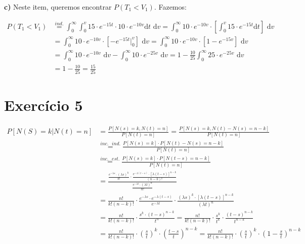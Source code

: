 \documentclass[12pt]{article}
\begin{document}
	\textbf{c)} Neste item, queremos encontrar $P(T_1 < V_1)$. Fazemos:
	
	\begin{equation*}
		\begin{split}
			P(T_1 < V_1) & \stackrel{ind.}{=} \int_{0}^{\infty} \int_{0}^{v} 15\cdot e^{-15t} \cdot 10\cdot e^{-10v} \text{d}t \text{ d}v = \int_{0}^{\infty} 10\cdot e^{-10v} \cdot \left[\int_{0}^{v} 15\cdot e^{-15t} \text{d}t\right] \text{ d}v \\
			& = \int_{0}^{\infty} 10\cdot e^{-10v} \cdot \left[-e^{-15t} \rvert_{0}^{v}\right] \text{ d}v = \int_{0}^{\infty} 10\cdot e^{-10v} \cdot \left[1 - e^{-15v} \right] \text{ d}v \\
			& = \int_{0}^{\infty} 10\cdot e^{-10v} \text{ d}v - \int_{0}^{\infty} 10\cdot e^{-25v} \text{ d}v = 1 - \frac{10}{25} \int_{0}^{\infty} 25\cdot e^{-25v} \text{ d}v \\
			& = 1 - \frac{10}{25} = \frac{15}{25}
		\end{split}
	\end{equation*}    
	 
	 \section*{Exercício 5}
	 
	 \begin{equation*}
	 	\begin{split}
		 	P[N(S) = k | N(t) = n] & = \frac{P[N(s) = k, N(t) = n]}{P[N(t) = n]} = \frac{P[N(s) = k, N(t) - N(s) = n-k]}{P[N(t) = n]} \\
		 	& \stackrel{inc.\text{ }ind.}{=} \frac{P[N(s) = k]\cdot P[N(t) - N(s) = n-k]}{P[N(t) = n]} \\
		 	& \stackrel{inc.\text{ }est.}{=} \frac{P[N(s) = k]\cdot P[N(t-s) = n-k]}{P[N(t) = n]} \\
		 	& = \frac{\frac{e^{-\lambda s} \cdot (\lambda s)^k}{k!}\cdot \frac{e^{-\lambda (t-s)} \cdot [\lambda (t-s)]^{n-k}}{(n-k)!}}{\frac{e^{-\lambda t} \cdot (\lambda t)^n}{n!}} \\
		 	& = \frac{n!}{k!(n-k)!} \cdot \frac{e^{-\lambda s} \cdot e^{-\lambda (t-s)}}{e^{-\lambda t}} \cdot \frac{(\lambda s)^k \cdot [\lambda (t-s)]^{n-k}}{(\lambda t)^n} \\
		 	& = \frac{n!}{k!(n-k)!} \cdot \frac{s^k \cdot (t-s)^{n-k}}{t^n} = \frac{n!}{k!(n-k)!} \cdot \frac{s^k}{t^k} \cdot \frac{(t-s)^{n-k}}{t^{n-k}} \\
		 	& = \frac{n!}{k!(n-k)!} \cdot \left(\frac{s}{t}\right)^k \cdot \left(\frac{t-s}{t}\right)^{n-k} = \frac{n!}{k!(n-k)!} \cdot \left(\frac{s}{t}\right)^k \cdot \left(1- \frac{s}{t}\right)^{n-k}	 	
	 	\end{split}
	 \end{equation*}
	 
\end{document}
